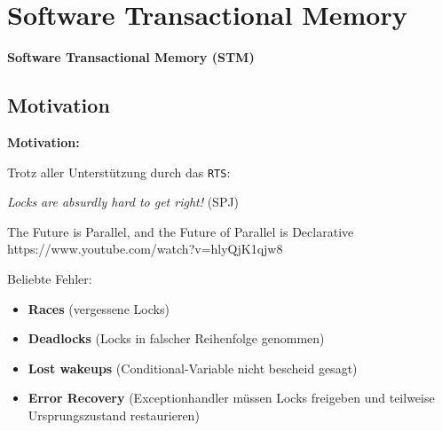 \documentclass{beamer}
\begin{document}

\section{Software Transactional Memory}

\begin{frame}

\begin{center}
\Large
\textbf{Software Transactional Memory (STM)}
\end{center}


\end{frame}


\subsection{Motivation}

\begin{frame}

\textbf{Motivation:}\smallskip

Trotz aller Unterstützung durch das \texttt{RTS}:\pause

\begin{center}
\emph{Locks are absurdly hard to get right!} (SPJ)
\end{center}
\tiny \glqq The Future is Parallel, and the Future of Parallel is Declarative \grqq
\vspace{-5pt} \\
 https://www.youtube.com/watch?v=hlyQjK1qjw8\normalsize
\pause
\smallskip\smallskip

Beliebte Fehler:

\begin{itemize}
\item \textbf{Races} (vergessene Locks)\pause
\item \textbf{Deadlocks} (Locks in falscher Reihenfolge genommen)\pause
\item \textbf{Lost wakeups} (Conditional-Variable nicht bescheid gesagt)\pause
\item \textbf{Error Recovery} (Exceptionhandler müssen Locks freigeben und teilweise Ursprungszustand restaurieren)
\end{itemize}

\end{frame}
\end{document}

